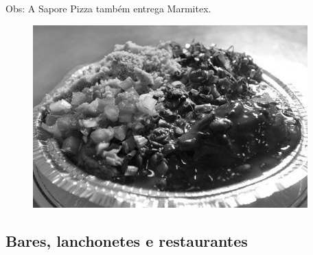Obs: A Sapore Pizza também entrega Marmitex.

\begin{figure}[h!]
    \centering
    \includegraphics[width=.45\textwidth]{img/barao/marmitex.jpg}
\end{figure}

\subsection{Bares, lanchonetes e restaurantes}


